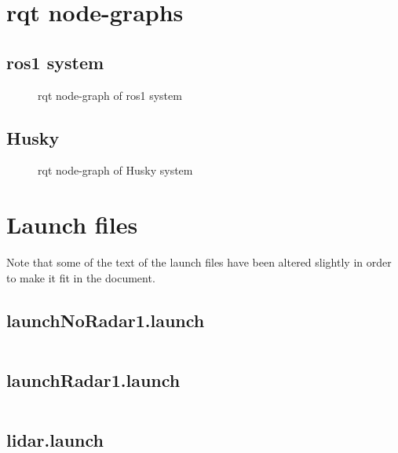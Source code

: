 \appendix

% 

\chapter{rqt node-graphs}
\section{ros1 system}
\label{Appdix:rqtROS1NB}
\newpage
\begin{figure}[H]

  \caption{rqt node-graph of ros1 system}
  \label{fig:Appdix:rqt:ros1_noBridge}
\end{figure}

\section{Husky}
\label{Appdix:rqtHusky}
\newpage
\begin{figure}[H]
\centering

  \caption{rqt node-graph of Husky system}
  \label{fig:Appdix:rqt:ros2_husky}
\end{figure}

\chapter{Launch files}\label{Appdix:LaunchFiles}
Note that some of the text of the launch files have been altered slightly in order to make it fit in the document.
\section{launchNoRadar1.launch}
\label{Appdix:launchNoRadar1.launch}
\inputminted{xml}{ros_system/launch/launchNoRadar1.launch}

\section{launchRadar1.launch}
\label{Appdix:launchRadar1.launch}
\inputminted{xml}{ros_system/launch/launchRadar1.launch}

\section{lidar.launch}
\label{Appdix:lidar.launch}
\inputminted{xml}{ros_system/launch/src/sublaunch/lidar.launch}

